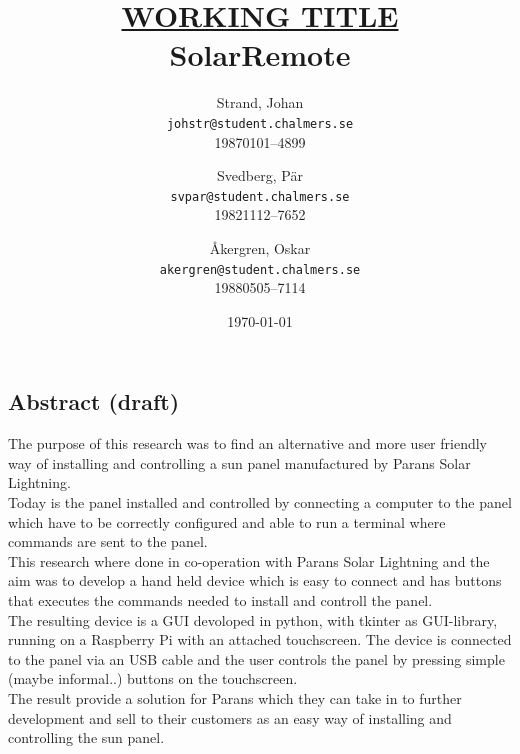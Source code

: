 \documentclass{article}
\author{    Strand, Johan \\ \texttt{johstr@student.chalmers.se} \\ 
            19870101--4899 \and
            Svedberg, Pär\\ \texttt{svpar@student.chalmers.se}  \\ 
            19821112--7652 \and
            Åkergren, Oskar\\ \texttt{akergren@student.chalmers.se}  \\ 19880505--7114
}
\title{\vspace{2cm}\underline{\small{WORKING TITLE}} \\ SolarRemote\vspace{1cm}}
\date{\vspace{8cm}\today}
\begin{document}
    \maketitle
    \thispagestyle{empty}

    \newpage 
    \subsection*{Abstract (draft)} %
    \label{sub:abstract}
            The purpose of this research was to find an alternative and more user friendly way of installing and controlling a sun panel manufactured by Parans Solar Lightning. \\

            \noindent Today is the panel installed and controlled by connecting a computer to the panel which have to be correctly configured and able to run a terminal where commands are sent to the panel.\\

            \noindent This research where done in co-operation with Parans Solar Lightning and the aim was to develop a hand held device which is easy to connect and has buttons that executes the commands needed to install and controll the panel.\\

            \noindent The resulting device is a GUI devoloped in python, with tkinter as GUI-library, running on a Raspberry Pi with an attached touchscreen. The device is connected to the panel via an USB cable and the user controls the panel by pressing simple (maybe informal..) buttons on the touchscreen.\\

            \noindent The result provide a solution for Parans which they can take in to further development and sell to their customers as an easy way of installing and controlling the sun panel.

    \newpage 
\end{document}
